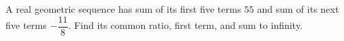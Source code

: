 A real geometric sequence has sum of its first five terms $55$ and sum of its next five terms $-\dfrac{11}{8}$. Find its common ratio, first term, and sum to infinity.
